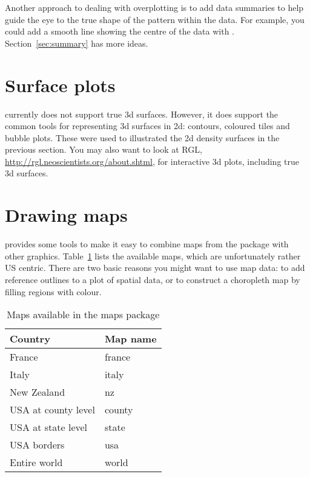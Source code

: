 Another approach to dealing with overplotting is to add data summaries to help guide the eye to the true shape of the pattern within the data.  For example,  you could add a smooth line showing the centre of the data with . Section~\ref{sec:summary} has more ideas.


\section{Surface plots}
\label{sec:surface}

\ggplot currently does not support true 3d surfaces.  However, it does support the common tools for representing 3d surfaces in 2d: contours, coloured tiles and bubble plots.  These were used to illustrated the 2d density surfaces in the previous section.  You may also want to look at RGL, \url{http://rgl.neoscientists.org/about.shtml}, for interactive 3d plots, including true 3d surfaces.

\section{Drawing maps}
\label{sec:maps}

\ggplot provides some tools to make it easy to combine maps from the  package with other \ggplot graphics.  Table~\ref{tbl:maps} lists the available maps, which are unfortunately rather US centric.  There are two basic reasons you might want to use map data: to add reference outlines to a plot of spatial data, or to construct a choropleth map by filling regions with colour.

\begin{table}
  \begin{center}
  \begin{tabular}{ll}
    \toprule
    Country & Map name \\
    \midrule
    France & france \\
    Italy & italy \\
    New Zealand & nz \\
    USA at county level & county \\
    USA at state level & state \\
    USA borders & usa \\
    Entire world & world \\ 
    \bottomrule
  \end{tabular}
  \end{center}
  \caption{Maps available in the maps package}
  \label{tbl:maps}
\end{table}

